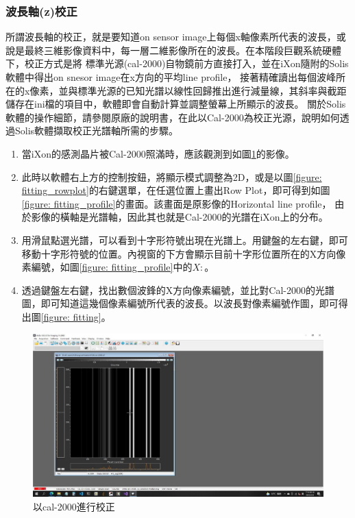 \documentclass[12pt]{article}
\begin{document}
    \subsubsection{波長軸(z)校正}
    所謂波長軸的校正，就是要知道on sensor image上每個x軸像素所代表的波長，或說是最終三維影像資料中，每一層二維影像所在的波長。在本階段巨觀系統硬體下，校正方式是將
    標準光源(cal-2000)自物鏡前方直接打入，並在iXon隨附的Solis軟體中得出on snesor image在x方向的平均line profile，
    接著精確讀出每個波峰所在的x像素，並與標準光源的已知光譜以線性回歸推出進行減量線，其斜率與截距儲存在ini檔的項目中，軟體即會自動計算並調整螢幕上所顯示的波長。
    關於Solis軟體的操作細節，請參閱原廠的說明書，在此以Cal-2000為校正光源，說明如何透過Solis軟體擷取校正光譜軸所需的步驟。
    \begin{enumerate}
        \item 當iXon的感測晶片被Cal-2000照滿時，應該觀測到如圖\ref{figure: fitting_image}的影像。
        \item 此時以軟體右上方的控制按鈕，將顯示模式調整為2D，或是以圖\ref{figure: fitting_rowplot}的右鍵選單，在任選位置上畫出Row Plot，即可得到如圖\ref{figure: fitting_profile}的畫面。該畫面是原影像的Horizontal line profile，
        由於影像的橫軸是光譜軸，因此其也就是Cal-2000的光譜在iXon上的分布。
        \item 用滑鼠點選光譜，可以看到十字形符號出現在光譜上。用鍵盤的左右鍵，即可移動十字形符號的位置。內視窗的下方會顯示目前十字形位置所在的X方向像素編號，如圖\ref{figure: fitting_profile}中的$X:$。
        \item 透過鍵盤左右鍵，找出數個波鋒的X方向像素編號，並比對Cal-2000的光譜圖，即可知道這幾個像素編號所代表的波長。以波長對像素編號作圖，即可得出圖\ref{figure: fitting}。
    \end{enumerate}
    \begin{figure}[ht]
        \centering
        \includegraphics[width=\linewidth]{cal2000examImage.jpeg}
        \caption{以cal-2000進行校正}
        \label{figure: fitting_image}
    \end{figure}
\end{document}
